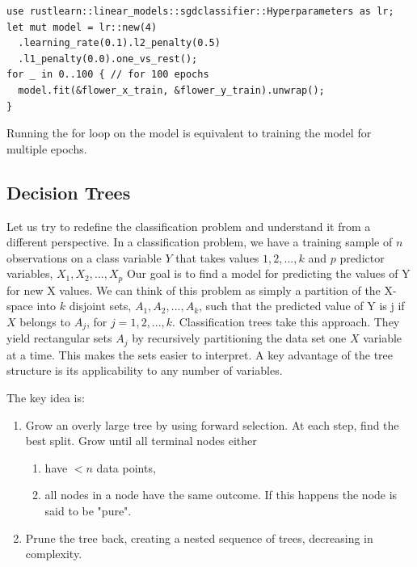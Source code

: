 \documentclass{book}
\begin{document}
\begin{lstlisting}[caption={chapter3\\/rustlearn\_classification\_tasks\\/src\\/logistic\_reg\\.rs}]
use rustlearn::linear_models::sgdclassifier::Hyperparameters as lr;
let mut model = lr::new(4)
  .learning_rate(0.1).l2_penalty(0.5)
  .l1_penalty(0.0).one_vs_rest();
for _ in 0..100 { // for 100 epochs
  model.fit(&flower_x_train, &flower_y_train).unwrap();
}
\end{lstlisting}
Running the for loop on the model is equivalent to training the model for multiple epochs.
\label{par:model_training}

\label{sub:logistic_regression}

\subsection{Decision Trees}%
Let us try to redefine the classification problem and understand it from a different perspective. In a classification problem, we have a training sample of $n$ observations on a class variable $Y$ that takes values $1, 2, ..., k$ and $p$ predictor variables, $X_1, X_2, ..., X_p$ Our goal is to find a model for predicting the values of Y for new X values. We can think of this problem as simply a partition of the X-space into $k$ disjoint sets, $A_1, A_2, ..., A_k$, such that the predicted value of Y is j if $X$ belongs to $A_j$, for $j = 1, 2, ..., k$. Classification trees take this approach. They yield rectangular sets $A_j$ by recursively partitioning the data set one $X$ variable at a time. This makes the sets easier to interpret. A key advantage of the tree structure is its applicability to any number of variables.

The key idea is:

\begin{enumerate}
	\item Grow an overly large tree by using forward selection. At each step, find the best split. Grow until all terminal nodes either
		\begin{enumerate}
			\item have $< n$ data points,
			\item all nodes in a node have the same outcome. If this happens the node is said to be "pure".
		\end{enumerate}
	\item Prune the tree back, creating a nested sequence of trees, decreasing in complexity.
\end{enumerate}
\end{document}
